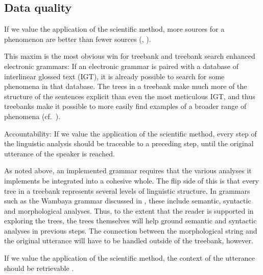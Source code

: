 \subsection{Data quality}

\begin{exe}
 If we value the application of the
scientific method, more sources for a phenomenon are better than
fewer sources (, ).
\end{exe}

This maxim is the most obvious win for treebank and treebank
search enhanced electronic grammars: If an electronic grammar
is paired with a database of interlinear glossed text (IGT), it
is already possible to search for some phenomena in that database.
The trees in a treebank make much more of the structure of the
sentences explicit than even the most meticulous IGT, and thus
treebanks make it possible to more easily find examples of a broader
range of phenomena (cf.\ ).

\begin{exe}
\ex\label{ex:ou} {\sc Accountability:} If we value the application of the
scientific method, every step of the linguistic analysis should be
traceable to a preceding step, until the original utterance of the
speaker is reached.
\end{exe}

As noted above, an implemented grammar requires that the various
analyses it implements be integrated into a cohesive whole.  The
flip side of this is that every tree in a treebank represents several
levels of linguistic structure.  In grammars such as the Wambaya
grammar discussed in , these include semantic, syntactic
and morphological analyses.  Thus, to the extent that the reader is
supported in exploring the trees, the trees themselves will help
ground semantic and syntactic analyses in previous steps.  The connection
between the morphological string and the original utterance will have
to be handled outside of the treebank, however.

\begin{exe}
 If we value the application of the
scientific method, the context of the utterance should be retrievable
\cite[450]{Weber:06}.
\end{exe}

